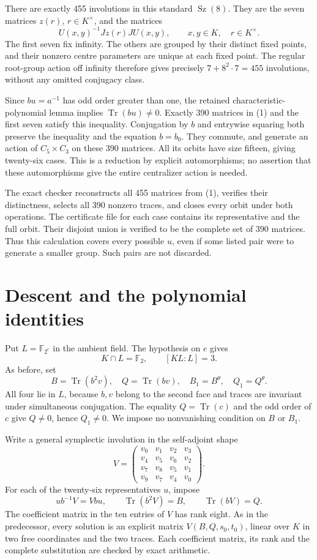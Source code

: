 \documentclass[11pt,a4paper]{article}
\newcommand{\Sz}{\operatorname{Sz}}
\newcommand{\Tr}{\operatorname{Tr}}
\newcommand{\F}{\mathbb F}
\begin{document}
There are exactly 455 involutions in this standard $\Sz(8)$. They
are the seven matrices $z(r)$, $r\in K^\times$, and the matrices
\[
 U(x,y)^{-1}Jz(r)JU(x,y),\qquad x,y\in K,\quad r\in K^\times.
                                                               \tag{1}
\]
The first seven fix infinity. The others are grouped by their
distinct fixed points, and their nonzero centre parameters are unique
at each fixed point. The regular root-group action off infinity
therefore gives precisely $7+8^2\cdot7=455$ involutions, without
any omitted conjugacy class.

Since $bu=a^{-1}$ has odd order greater than one, the retained
characteristic-polynomial lemma implies $\Tr(bu)\ne0$.
Exactly 390 matrices in (1) and the first seven satisfy this
inequality. Conjugation by $b$ and entrywise squaring both preserve
the inequality and the equation $b=b_0$. They commute, and generate
an action of $C_5\times C_3$ on these 390 matrices. All its orbits
have size fifteen, giving twenty-six cases. This is a reduction by
explicit automorphisms; no assertion that these automorphisms give
the entire centralizer action is needed.

The exact checker reconstructs all 455 matrices from (1), verifies
their distinctness, selects all 390 nonzero traces, and closes every
orbit under both operations. The certificate file for each case
contains its representative and the full orbit. Their disjoint union
is verified to be the complete set of 390 matrices. Thus this
calculation covers every possible $u$, even if some listed pair were
to generate a smaller group. Such pairs are not discarded.

\section*{Descent and the polynomial identities}

Put $L=\F_{2^e}$ in the ambient field. The hypothesis on $e$ gives
\[
               K\cap L=\F_2,\qquad [KL:L]=3.          \tag{2}
\]
As before, set
\[
 B=\Tr(b^2v),\quad Q=\Tr(bv),\quad
 B_1=B^\theta,\quad Q_1=Q^\theta.
\]
All four lie in $L$, because $b,v$ belong to the second face and
traces are invariant under simultaneous conjugation. The equality
$Q=\Tr(c)$ and the odd order of $c$ give $Q\ne0$, hence $Q_1\ne0$.
We impose no nonvanishing condition on $B$ or $B_1$.

Write a general symplectic involution in the self-adjoint shape
\[
 V=\begin{pmatrix}
 v_0&v_1&v_2&v_3\\v_4&v_5&v_6&v_2\\
 v_7&v_8&v_5&v_1\\v_9&v_7&v_4&v_0
 \end{pmatrix}.
\]
For each of the twenty-six representatives $u$, impose
\[
 ub^{-1}V=Vbu,\qquad \Tr(b^2V)=B,\qquad \Tr(bV)=Q.    \tag{3}
\]
The coefficient matrix in the ten entries of $V$ has rank eight.
As in the predecessor, every solution is an explicit matrix
$V(B,Q,s_0,t_0)$, linear over $K$ in two free coordinates and the
two traces. Each coefficient matrix, its rank and the complete
substitution are checked by exact arithmetic.
\end{document}
